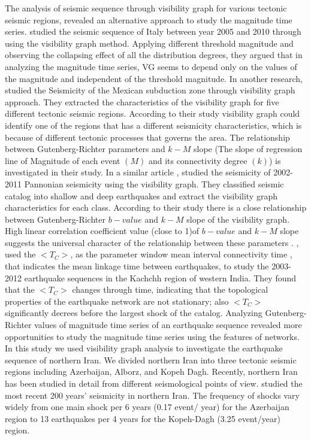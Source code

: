 \noindent
The analysis of seismic sequence through visibility graph for various tectonic seismic regions, revealed an alternative approach to study the magnitude time series. \citet{Telesca2012} studied the seismic sequence of Italy between year 2005 and 2010 through using the visibility graph method. Applying different threshold magnitude and observing the collapsing effect of all the distribution degrees, they argued that in analyzing the magnitude time series, VG seems to depend only on the values of the magnitude and independent of the threshold magnitude. In another research, \citet{Telesca2013} studied the Seismicity of the Mexican subduction zone through visibility graph approach. They extracted the characteristics of the visibility graph for five different tectonic seismic regions.  According to their study visibility graph could identify one of the regions that has a different seismicity characteristics, which is because of different tectonic processes that governs the area. The relationship between Gutenberg-Richter parameters and $k-M$ slope (The slope of regression line of Magnitude  of each event $(M)$ and its connectivity degree $(k)$) is investigated in their study. In a similar article \citet{Telesca2014}, studied the seismicity of 2002-2011 Pannonian seismicity using the visibility graph. They classified seismic catalog into shallow and deep earthquakes and extract the visibility graph characteristics for each class. According to their study there is a close relationship between Gutenberg-Richter $b-value$ and $k-M$ slope of the visibility graph. High linear correlation coefficient value (close to 1)of $b-value$ and $k-M$ slope suggests the universal character of the relationship between these parameters \citep{Telesca2014}.  \citet{Telesca2016} , used the $ <T_C>$, as the parameter window mean interval connectivity time ,  that indicates the mean linkage time between earthquakes, to study the 2003-2012 earthquake sequences in the Kachchh region of western India. They found that the $<T_C>$ changes through time, indicating that the topological properties of the earthquake network are not stationary; also $<T_C>$ significantly decrees before the largest shock of the catalog. Analyzing Gutenberg-Richter values of  magnitude time series of an earthquake sequence revealed more opportunities to study the magnitude time series using the features of networks. \\

\noindent
In this study we used visibility graph analysis to investigate the earthquake sequence of northern Iran. We divided northern Iran into three tectonic seismic regions including Azerbaijan, Alborz, and Kopeh Dagh.  Recently, northern Iran has been studied in detail from different seismological points of view. \citet{Nemati2015} studied the most recent 200 years' seismicity in northern Iran. The frequency of shocks vary widely from one main shock per 6 years (0.17 event/ year) for the Azerbaijan region to 13 earthquakes per 4 years for the Kopeh-Dagh (3.25 event/year) region. \\


